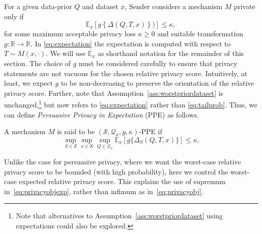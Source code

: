 \documentclass{article}
\theoremstyle{plain}
\theoremstyle{plain}
\theoremstyle{definition}
\theoremstyle{remark}
\theoremstyle{plain}
\newenvironment{manualtheorem}[1]{%
  \IfBlankTF{#1}
    {\renewcommand{\themanualtheoreminner}{\unskip}}
    {\renewcommand\themanualtheoreminner{#1}}%
  \manualtheoreminner
}{\endmanualtheoreminner}
\newcommand{\ExMx}{\mathbb{E}_{x}}
\newcommand{\xset}{\mathsf{X}}
\begin{document}
\begin{manualtheorem}{4*}\label{ass:expectation} For a given data-prior $Q$ and dataset $x$, Sender considers a mechanism $M$ private only if
\begin{equation}\label{eq:expectation}
    \ExMx\left[g\left\{\Delta(Q,T,x)\right\}) \right] \leq \kappa,
\end{equation}
for some maximum acceptable privacy loss $\kappa \geq 0$ and suitable transformation $g:\mathbb{R}\rightarrow \mathbb{R}$. 
\end{manualtheorem}
In \eqref{eq:expectation} the expectation is computed with respect to $T\sim M(x,\cdot)$. We will use $\ExMx$ as shorthand notation for the remainder of this section. The choice of $g$ must be considered carefully to ensure that privacy statements are not vacuous for the chosen relative privacy score. Intuitively, at least, we expect $g$ to be non-decreasing to preserve the orientation of the relative privacy score. Further, note that Assumption~\ref{ass:worstpriordataset} is unchanged,\footnote{Note that alternatives to Assumption~\ref{ass:worstpriordataset} using expectations could also be explored.} but now refers to \eqref{eq:expectation} rather than  \eqref{eq:tailprob}. Thus, we can define \textit{Persuasive Privacy in Expectation} (PPE) as follows.
\begin{definition}\label{def:ppe}
    A mechanism $M$ is said to be $(\mathcal{S},\mathcal{Q}_x,g,\kappa)$-PPE if \begin{equation}\label{eq:privacyobjexp}
     \sup_{S \in \mathcal{S}}\sup_{x \in \xset}\sup_{Q \in \mathcal{Q}_x}\ExMx\left[g\{\Delta_S(Q,T,x)\}\right] \leq \kappa.
\end{equation}
\end{definition}
Unlike the case for persuasive privacy, where we want the worst-case relative privacy score to be bounded (with high probability), here we control the worst-case expected relative privacy score. This explains the use of supremum in~\eqref{eq:privacyobjexp}, rather than infimum as in~\eqref{eq:privacyobj}. 
\end{document}
